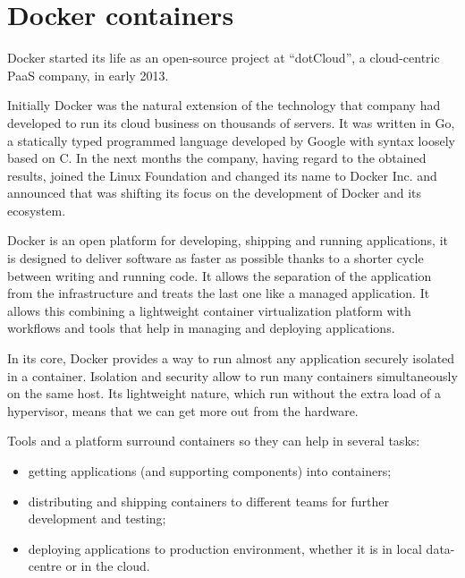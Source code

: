 %
%
\section{Docker containers}
\label{sec:problemSpace-docker}
Docker started its life as an open-source project at “dotCloud”, a cloud-centric PaaS company, in early
2013.

Initially Docker was the natural extension of the technology that company had developed to run its cloud
business on thousands of servers. It was written in Go, a statically typed programmed language developed
by Google with syntax loosely based on C. In the next months the company, having regard to the obtained
results, joined the Linux Foundation and changed its name to Docker Inc. and announced that was shifting
its focus on the development of Docker and its ecosystem.

Docker is an open platform for developing, shipping and running applications, it is designed to deliver
software as faster as possible thanks to a shorter cycle between writing and running code. It allows the
separation of the application from the infrastructure and treats the last one like a managed application.
It allows this combining a lightweight container virtualization platform with workflows and tools
that help in managing and deploying applications.

In its core, Docker provides a way to run almost any application securely isolated in a container.
Isolation and security allow to run many containers simultaneously on the same host. Its lightweight
nature, which run without the extra load of a hypervisor, means that we can get more out from the
hardware.

Tools and a platform surround containers so they can help in several tasks:

\begin{itemize}
	\item{getting applications (and supporting components) into containers;}
	\item{distributing and shipping containers to different teams for further development and testing;}
	\item{deploying applications to production environment, whether it is in local data-centre or in the
		cloud.}
\end{itemize}

